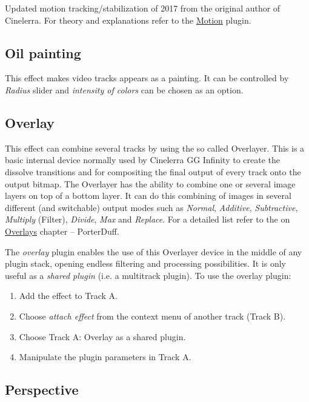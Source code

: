 Updated motion tracking/stabilization of 2017 from the original author of Cinelerra. For theory and explanations refer to the \href{sub:motion}{Motion} plugin.

\subsection{Oil painting}%
\label{sub:oil_painting}

This effect makes video tracks appears as a painting. It can be controlled by \textit{Radius} slider and \textit{intensity of colors} can be chosen as an option.

\subsection{Overlay}%
\label{sub:overlay}

This effect can combine several tracks by using the so called Overlayer. This is a basic internal device normally used by Cinelerra GG Infinity to create the dissolve transitions and for compositing the final output of every track onto the output bitmap. The Overlayer has the ability to combine one or several image layers on top of a bottom layer. It can do this combining of images in several different (and switchable) output modes such as \textit{Normal}, \textit{Additive}, \textit{Subtractive}, \textit{Multiply} (Filter), \textit{Divide}, \textit{Max} and \textit{Replace}. For a detailed list refer to the on \href{cha:overlays}{Overlays} chapter  -- PorterDuff.

The \textit{overlay} plugin enables the use of this Overlayer device in the middle of any plugin stack, opening endless filtering and processing possibilities. It is only useful as a \textit{shared plugin} (i.e. a multitrack plugin). To use the overlay plugin:

\begin{enumerate}
    \item Add the effect to Track A.
    \item Choose \textit{attach effect} from the context menu of another track (Track B).
    \item Choose Track A: Overlay as a shared plugin.
    \item Manipulate the plugin parameters in Track A.
\end{enumerate}

\subsection{Perspective}%
\label{sub:perspective}

